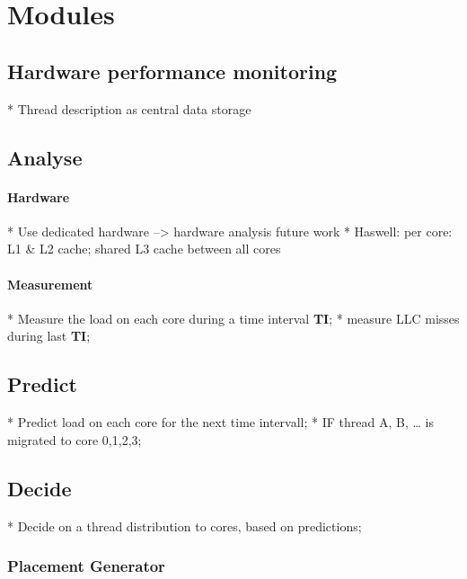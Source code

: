\section{Modules}
\label{design:modules}

\subsection{Hardware performance monitoring}

* Thread description as central data storage

\subsection{Analyse}
  \paragraph{Hardware}
    * Use dedicated hardware --> hardware analysis future work
    * Haswell: per core: L1 \& L2 cache; shared L3 cache between all cores

  \paragraph{Measurement}
    * Measure the load on each core during a time interval \textbf{TI};
    * measure LLC misses during last \textbf{TI};


\subsection{Predict}

  * Predict load on each core for the next time intervall;
    * IF thread {A, B, \ldots} is migrated to core {0,1,2,3};


\subsection{Decide}

  * Decide on a thread distribution to cores, based on predictions;
  \subsubsection{Placement Generator}

